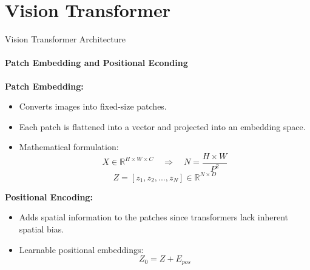 \section{Vision Transformer}

\begin{frame}[fragile]{Vision Transformer Architecture}
  \framesubtitle{Patch Embedding and Positional Econding}
  \textbf{Patch Embedding:}
  \begin{itemize}
    \item Converts images into fixed-size patches.
    \item Each patch is flattened into a vector and projected into an embedding space.
    \item Mathematical formulation:
      \begin{equation}
        X \in \mathbb{R}^{H \times W \times C} \quad \Rightarrow \quad N = \frac{H \times W}{P^2}
      \end{equation}
      \begin{equation}
        Z = [z_1, z_2, ..., z_N] \in \mathbb{R}^{N \times D}
      \end{equation}
  \end{itemize}

  \textbf{Positional Encoding:}
  \begin{itemize}
    \item Adds spatial information to the patches since transformers lack inherent spatial bias.
    \item Learnable positional embeddings:
      \begin{equation}
        Z_0 = Z + E_{pos}
      \end{equation}
  \end{itemize}
\end{frame}

